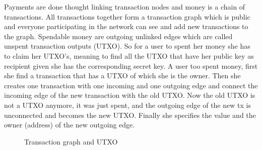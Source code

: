 Payments are done thought linking transaction nodes and money is a chain of transactions. All transactions together form a transaction graph which is public and everyone participating in
the network can see and add new transactions to the graph. Spendable money are outgoing unlinked edges which are called unspent transaction outputs (UTXO). So for a user to spent her money
she has to claim her UTXO's, meaning to find all the UTXO that have her public key as recipient given she has the corresponding secret key. A user too spent money, first she find a transaction
that has a UTXO of which she is the owner. Then she creates one transaction with one incoming and one outgoing edge and connect the incoming edge of the new transaction with the old UTXO.
Now the old UTXO is not a UTXO anymore, it was just spent, and the outgoing edge of the new tx is unconnected and becomes the new UTXO. Finally she specifies the value and the owner (address)
of the new outgoing edge.


\begin{figure}[ht!]
    \centering
  \caption{Transaction graph and UTXO}
  \label{fig:bl_utxo}
\end{figure}

